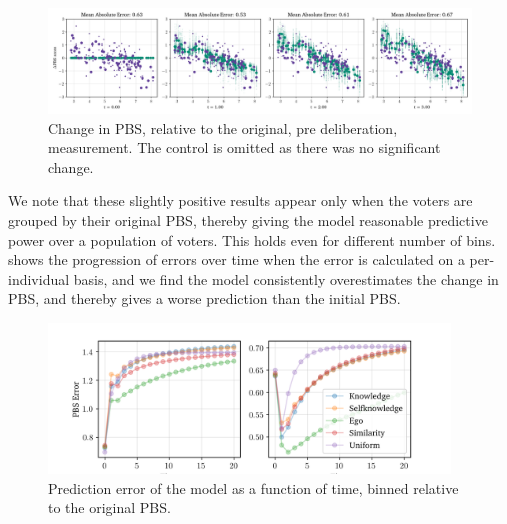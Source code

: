 \begin{figure}[ht]
	\begin{center}
		\includegraphics[width=\textwidth]{Figures/change_pbs_scores.png}
	\end{center}
	\caption{Change in  PBS, relative to the original, pre deliberation, measurement. The control is  omitted as there was no significant change.}\label{fig:delta_pbs}
\end{figure}


We note that these slightly positive results appear only when the voters are
grouped by their original PBS, thereby giving the model reasonable predictive
power over a population of voters.  This holds even for different number of
bins.  shows the progression of errors over time when
the error is calculated on a per-individual basis, and we find the model
consistently overestimates the change in PBS, and thereby gives a worse
prediction than the initial PBS.

\begin{figure}[ht]
	\begin{center}
		\includegraphics[width=0.95\textwidth]{Figures/errors_binned.png}
	\end{center}
	\caption{Prediction error of the model as a function of time, binned relative to the original  PBS.}\label{fig:binned_errors}
\end{figure}



